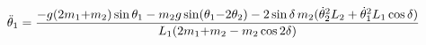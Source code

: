 \documentclass[preview]{standalone}
\begin{document}
\begin{align*}
\special{dvisvgm:raw <g id='unique000'>}\ddot\theta_1 = \frac{-g(2m_1{+}m_2)\sin\theta_1- m_2 g\sin(\theta_1{-}2\theta_2)- 2\sin\delta\, m_2(\dot\theta_2^2 L_2+ \dot\theta_1^2 L_1 \cos\delta)}{L_1(2m_1{+}m_2 - m_2\cos 2\delta)}\special{dvisvgm:raw </g>}
\end{align*}
\end{document}
